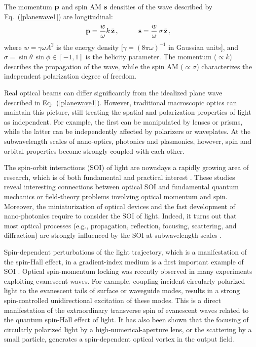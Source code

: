 \documentclass[journal=apchd5,manuscript=article]{achemso}
\begin{document}
The momentum ${\bf p}$ and spin AM ${\bf s}$ densities of the wave described by  Eq.\ (\ref{planewave1}) are longitudinal:
\begin{equation}\label{planewave2}
{\bf p} = \frac{w}{\omega} k\, \bar {\bf z}\, , \hspace{1 cm} {\bf s} = \frac{w}{\omega}\, \sigma\, \bar {\bf z}\, ,
\end{equation}
where $w = \gamma \omega  A^2$ is the energy density [$\gamma = (8 \pi \omega)^{-1}$ in Gaussian units], and $\sigma = \sin \theta\, \sin \phi \in [-1,1]$ is the helicity parameter.
The momentum ($\propto k$) describes the propagation of the wave, while the spin AM ($\propto \sigma$) characterizes the independent polarization degree of freedom.

Real optical beams can differ significantly from the idealized plane wave described in Eq.\ (\ref{planewave1}). However, traditional macroscopic optics can maintain this picture, still treating the spatial and polarization properties of light as independent. For example, the first can be manipulated by lenses or prisms, while the latter can be independently affected by polarizers or waveplates. At the subwavelength scales of nano-optics, photonics and plasmonics, however, spin and orbital properties become strongly coupled with each other. 

The spin-orbit interactions (SOI) of light are nowadays a rapidly growing area of research, which is of both fundamental and practical interest \cite{bliokh2015, bliokh2015spin, Antognozzi2016}. These studies reveal interesting connections between optical SOI and fundamental quantum mechanics or field-theory problems involving optical momentum and spin. Moreover, the miniaturization of optical devices and the fast development of nano-photonics require to consider the SOI of light. Indeed, it turns out that most optical processes (e.g., propagation, reflection, focusing, scattering, and diffraction) are strongly influenced by the SOI at subwavelength scales \cite{petersen2014chiral,Donato2014,o2014spin, Zhang2017}.

Spin-dependent perturbations of the light trajectory, which is a manifestation of the spin-Hall effect, in a gradient-index medium is a first important example of SOI \cite{bliokh2015quantum,bliokh2015}.
Optical spin-momentum locking was recently observed in many experiments exploiting evanescent waves. For example, coupling incident circularly-polarized light to the evanescent tails of surface or waveguide modes, results in a strong spin-controlled unidirectional excitation of these modes. This is a direct manifestation of the extraordinary transverse spin of evanescent waves related to the quantum spin-Hall effect of light. It has also been shown that the focusing of circularly polarized light by a high-numerical-aperture lens, or the scattering by a small particle, generates a spin-dependent optical vortex in the output field.
\end{document}
